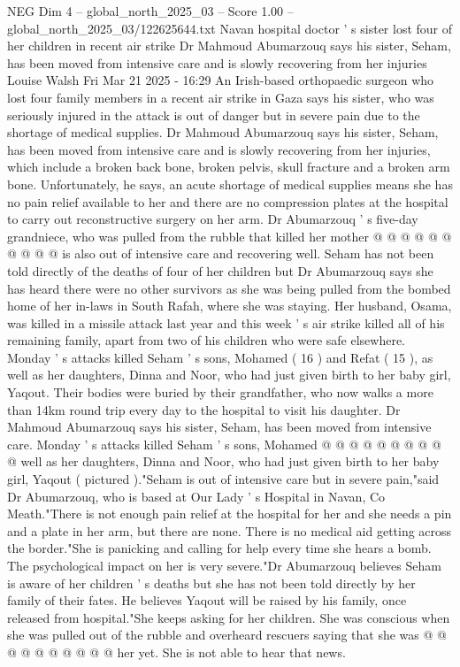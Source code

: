\begin{textsample}{NEG Dim 4 – global\_north\_2025\_03 – Score 1.00 – global\_north\_2025\_03/122625644.txt}  \label{ex:f4_neg_392}
Navan hospital doctor ' s sister lost four of her children in recent air strike Dr Mahmoud Abumarzouq says his sister, Seham, has been moved from intensive care and is slowly recovering from her injuries Louise Walsh Fri Mar 21 2025 - 16:29 An Irish-based orthopaedic surgeon who lost four family members in a recent air strike in Gaza says his sister, who was seriously injured in the attack is out of danger but in severe pain due to the shortage of medical supplies.
Dr Mahmoud Abumarzouq says his sister, Seham, has been moved from intensive care and is slowly recovering from her injuries, which include a broken back bone, broken pelvis, skull fracture and a broken arm bone.
Unfortunately, he says, an acute shortage of medical supplies means she has no pain relief available to her and there are no compression plates at the hospital to carry out reconstructive surgery on her arm.
Dr Abumarzouq ' s five-day grandniece, who was pulled from the rubble that killed her mother @ @ @ @ @ @ @ @ @ @ is also out of intensive care and recovering well.
Seham has not been told directly of the deaths of four of her children but Dr Abumarzouq says she has heard there were no other survivors as she was being pulled from the bombed home of her in-laws in South Rafah, where she was staying.
Her husband, Osama, was killed in a missile attack last year and this week ' s air strike killed all of his remaining family, apart from two of his children who were safe elsewhere.
Monday ' s attacks killed Seham ' s sons, Mohamed ( 16 ) and Refat ( 15 ), as well as her daughters, Dinna and Noor, who had just given birth to her baby girl, Yaqout.
Their bodies were buried by their grandfather, who now walks a more than 14km round trip every day to the hospital to visit his daughter.
Dr Mahmoud Abumarzouq says his sister, Seham, has been moved from intensive care.
Monday ' s attacks killed Seham ' s sons, Mohamed @ @ @ @ @ @ @ @ @ @ well as her daughters, Dinna and Noor, who had just given birth to her baby girl, Yaqout ( pictured )."Seham is out of intensive care but in severe pain,"said Dr Abumarzouq, who is based at Our Lady ' s Hospital in Navan, Co Meath."There is not enough pain relief at the hospital for her and she needs a pin and a plate in her arm, but there are none.
There is no medical aid getting across the border."She is panicking and calling for help every time she hears a bomb.
The psychological impact on her is very severe."Dr Abumarzouq believes Seham is aware of her children ' s deaths but she has not been told directly by her family of their fates.
He believes Yaqout will be raised by his family, once released from hospital."She keeps asking for her children.
She was conscious when she was pulled out of the rubble and overheard rescuers saying that she was @ @ @ @ @ @ @ @ @ @ her yet.
She is not able to hear that news.

\end{textsample}
